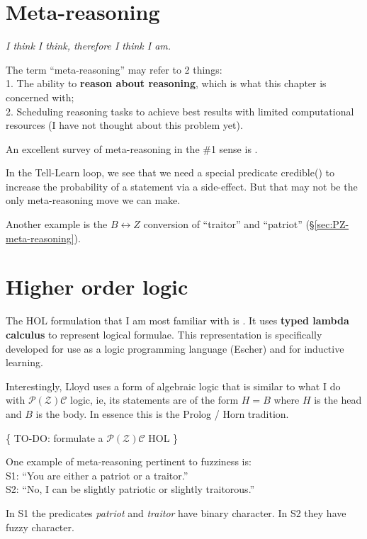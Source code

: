 
\section{Meta-reasoning}
\begin{flushright}
\emph{I think I think, therefore I think I am.}
\end{flushright}

The term ``meta-reasoning'' may refer to 2 things:\\
1. The ability to \textbf{reason about reasoning}, which is what this chapter is concerned with;\\
2. Scheduling reasoning tasks to achieve best results with limited computational resources (I have not thought about this problem yet).

An excellent survey of meta-reasoning in the \#1 sense is \citep*{Constantini2002}.

In the Tell-Learn loop, we see that we need a special predicate credible() to increase the probability of a statement via a side-effect.  But that may not be the only meta-reasoning move we can make.

Another example is the $B \leftrightarrow Z$ conversion of ``traitor'' and ``patriot'' (\S\ref{sec:PZ-meta-reasoning}).

\section{Higher order logic}
\label{sec:HOL}

The HOL formulation that I am most familiar with is \citep*{Lloyd2003}.  It uses \textbf{typed lambda calculus} to represent logical formulae.  This representation is specifically developed for use as a logic programming language (Escher) and for inductive learning.

Interestingly, Lloyd uses a form of algebraic logic that is similar to what I do with $\mathcal{P(Z)C}$ logic, ie, its statements are of the form $H = B$ where $H$ is the head and $B$ is the body.  In essence this is the Prolog / Horn tradition.

\{ TO-DO:  formulate a $\mathcal{P(Z)C}$ HOL \}

\label{sec:PZ-meta-reasoning}

One example of meta-reasoning pertinent to fuzziness is:\\
\hspace*{1cm} S1: ``You are either a patriot or a traitor.''\\
\hspace*{1cm} S2: ``No, I can be slightly patriotic or slightly traitorous.''

In S1 the predicates \textit{patriot} and \textit{traitor} have binary character.  In S2 they have fuzzy character.

\underconst
